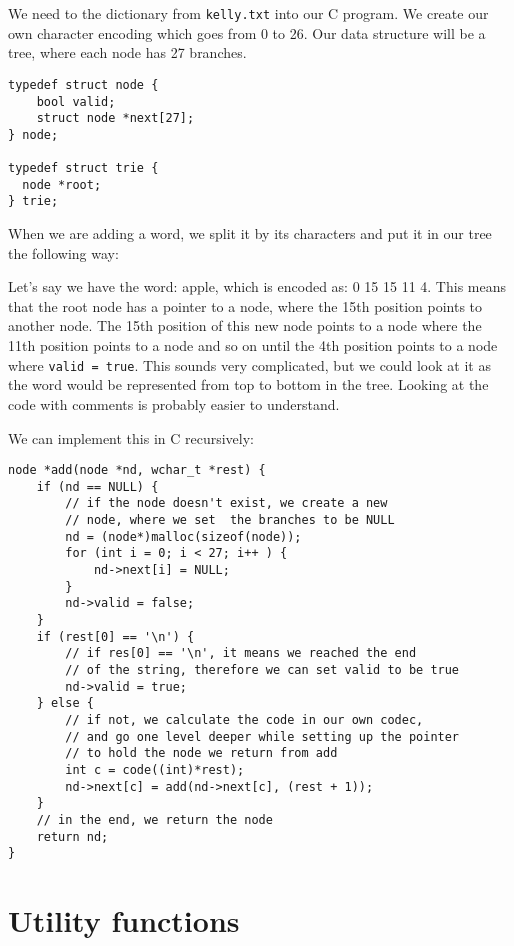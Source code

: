 \documentclass[a4paper,11pt]{article}
\begin{document}
    We need to the dictionary from {\tt kelly.txt} into our C program.
    We create our own character encoding which goes from 0 to 26.
    Our data structure will be a tree, where each node has 27 branches.

    \begin{verbatim}
typedef struct node {
    bool valid;
    struct node *next[27];
} node;

typedef struct trie {
  node *root;
} trie;
    \end{verbatim}

    When we are adding a word, we split it by its characters and put it in our tree the following way:
    
    Let's say we have the word: apple, which is encoded as: 0 15 15 11 4. 
    This means that the root node has a pointer to a node, where the 15th position points to another node.
    The 15th position of this new node points to a node where the 11th position points to a node and so on until the 4th position points to a node where {\tt valid = true}.
    This sounds very complicated, but we could look at it as the word would be represented from top to bottom in the tree.
    Looking at the code with comments is probably easier to understand.

    We can implement this in C recursively:

    \begin{verbatim}
node *add(node *nd, wchar_t *rest) {
    if (nd == NULL) {
        // if the node doesn't exist, we create a new
        // node, where we set  the branches to be NULL
        nd = (node*)malloc(sizeof(node));
        for (int i = 0; i < 27; i++ ) {
            nd->next[i] = NULL;
        }
        nd->valid = false;
    }
    if (rest[0] == '\n') {
        // if res[0] == '\n', it means we reached the end
        // of the string, therefore we can set valid to be true
        nd->valid = true;
    } else {
        // if not, we calculate the code in our own codec,
        // and go one level deeper while setting up the pointer
        // to hold the node we return from add
        int c = code((int)*rest);
        nd->next[c] = add(nd->next[c], (rest + 1));
    } 
    // in the end, we return the node
    return nd;
}
    \end{verbatim}

    \section*{Utility functions}
\end{document}
